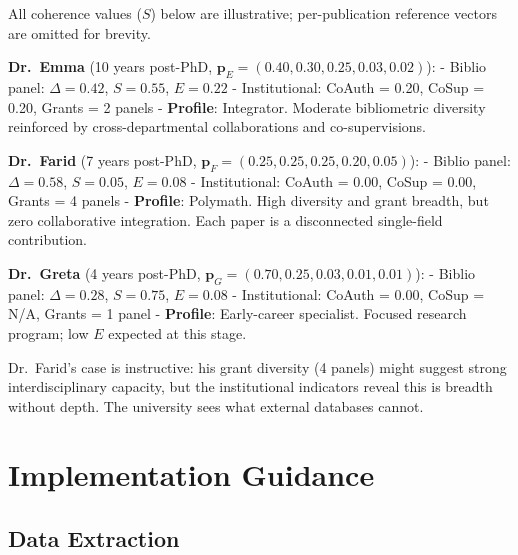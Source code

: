\documentclass[
]{article}
\begin{document}
All coherence values (\(S\)) below are illustrative; per-publication
reference vectors are omitted for brevity.

\textbf{Dr.~Emma} (10 years post-PhD,
\(\mathbf{p}_E = (0.40, 0.30, 0.25, 0.03, 0.02)\)): - Biblio panel:
\(\Delta = 0.42\), \(S = 0.55\), \(E = 0.22\) - Institutional: CoAuth =
0.20, CoSup = 0.20, Grants = 2 panels - \textbf{Profile}: Integrator.
Moderate bibliometric diversity reinforced by cross-departmental
collaborations and co-supervisions.

\textbf{Dr.~Farid} (7 years post-PhD,
\(\mathbf{p}_F = (0.25, 0.25, 0.25, 0.20, 0.05)\)): - Biblio panel:
\(\Delta = 0.58\), \(S = 0.05\), \(E = 0.08\) - Institutional: CoAuth =
0.00, CoSup = 0.00, Grants = 4 panels - \textbf{Profile}: Polymath. High
diversity and grant breadth, but zero collaborative integration. Each
paper is a disconnected single-field contribution.

\textbf{Dr.~Greta} (4 years post-PhD,
\(\mathbf{p}_G = (0.70, 0.25, 0.03, 0.01, 0.01)\)): - Biblio panel:
\(\Delta = 0.28\), \(S = 0.75\), \(E = 0.08\) - Institutional: CoAuth =
0.00, CoSup = N/A, Grants = 1 panel - \textbf{Profile}: Early-career
specialist. Focused research program; low \(E\) expected at this stage.

Dr.~Farid's case is instructive: his grant diversity (4 panels) might
suggest strong interdisciplinary capacity, but the institutional
indicators reveal this is breadth without depth. The university sees
what external databases cannot.

\hypertarget{implementation-guidance}{%
\section{Implementation Guidance}\label{implementation-guidance}}

\hypertarget{data-extraction}{%
\subsection{Data Extraction}\label{data-extraction}}
\end{document}
